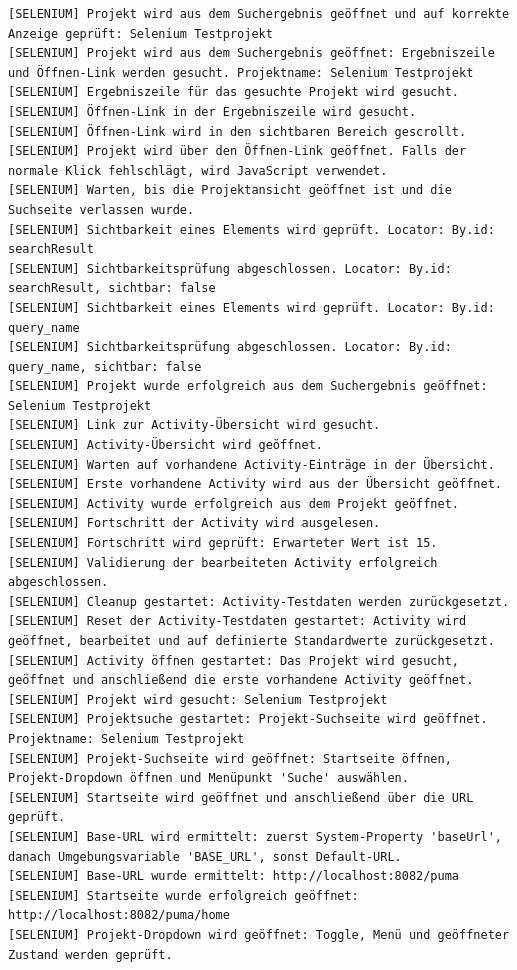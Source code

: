 \begin{lstlisting}[caption={Selenium -- Kontrolllauf Activity bearbeiten (Erfolgreich)}, label={lst:sel_ctrl_act_ok}, style=logStyle]
[SELENIUM] Projekt wird aus dem Suchergebnis geöffnet und auf korrekte Anzeige geprüft: Selenium Testprojekt
[SELENIUM] Projekt wird aus dem Suchergebnis geöffnet: Ergebniszeile und Öffnen-Link werden gesucht. Projektname: Selenium Testprojekt
[SELENIUM] Ergebniszeile für das gesuchte Projekt wird gesucht.
[SELENIUM] Öffnen-Link in der Ergebniszeile wird gesucht.
[SELENIUM] Öffnen-Link wird in den sichtbaren Bereich gescrollt.
[SELENIUM] Projekt wird über den Öffnen-Link geöffnet. Falls der normale Klick fehlschlägt, wird JavaScript verwendet.
[SELENIUM] Warten, bis die Projektansicht geöffnet ist und die Suchseite verlassen wurde.
[SELENIUM] Sichtbarkeit eines Elements wird geprüft. Locator: By.id: searchResult
[SELENIUM] Sichtbarkeitsprüfung abgeschlossen. Locator: By.id: searchResult, sichtbar: false
[SELENIUM] Sichtbarkeit eines Elements wird geprüft. Locator: By.id: query_name
[SELENIUM] Sichtbarkeitsprüfung abgeschlossen. Locator: By.id: query_name, sichtbar: false
[SELENIUM] Projekt wurde erfolgreich aus dem Suchergebnis geöffnet: Selenium Testprojekt
[SELENIUM] Link zur Activity-Übersicht wird gesucht.
[SELENIUM] Activity-Übersicht wird geöffnet.
[SELENIUM] Warten auf vorhandene Activity-Einträge in der Übersicht.
[SELENIUM] Erste vorhandene Activity wird aus der Übersicht geöffnet.
[SELENIUM] Activity wurde erfolgreich aus dem Projekt geöffnet.
[SELENIUM] Fortschritt der Activity wird ausgelesen.
[SELENIUM] Fortschritt wird geprüft: Erwarteter Wert ist 15.
[SELENIUM] Validierung der bearbeiteten Activity erfolgreich abgeschlossen.
[SELENIUM] Cleanup gestartet: Activity-Testdaten werden zurückgesetzt.
[SELENIUM] Reset der Activity-Testdaten gestartet: Activity wird geöffnet, bearbeitet und auf definierte Standardwerte zurückgesetzt.
[SELENIUM] Activity öffnen gestartet: Das Projekt wird gesucht, geöffnet und anschließend die erste vorhandene Activity geöffnet.
[SELENIUM] Projekt wird gesucht: Selenium Testprojekt
[SELENIUM] Projektsuche gestartet: Projekt-Suchseite wird geöffnet. Projektname: Selenium Testprojekt
[SELENIUM] Projekt-Suchseite wird geöffnet: Startseite öffnen, Projekt-Dropdown öffnen und Menüpunkt 'Suche' auswählen.
[SELENIUM] Startseite wird geöffnet und anschließend über die URL geprüft.
[SELENIUM] Base-URL wird ermittelt: zuerst System-Property 'baseUrl', danach Umgebungsvariable 'BASE_URL', sonst Default-URL.
[SELENIUM] Base-URL wurde ermittelt: http://localhost:8082/puma
[SELENIUM] Startseite wurde erfolgreich geöffnet: http://localhost:8082/puma/home
[SELENIUM] Projekt-Dropdown wird geöffnet: Toggle, Menü und geöffneter Zustand werden geprüft.

\end{lstlisting}
